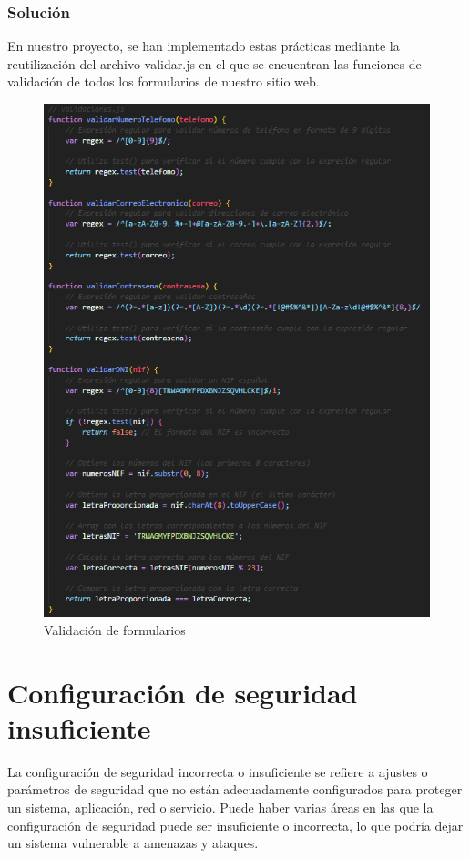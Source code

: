 \documentclass{report}
\begin{document}
                \subsubsection{Solución}
                    En nuestro proyecto, se han implementado estas prácticas mediante la reutilización del archivo validar.js en el que se encuentran las funciones de validación de todos los formularios de nuestro sitio web.
                    \begin{figure}[H]
                        \centering
                        \includegraphics[width=\textwidth]{./img/vulnerabilidades/3.4/1.1.png}
                        \caption{Validación de formularios}
                    \end{figure}
            \clearpage
        \section{Configuración de seguridad insuficiente}
            La configuración de seguridad incorrecta o insuficiente se refiere a ajustes o parámetros de seguridad que no están adecuadamente configurados para proteger un sistema, aplicación, red o servicio. Puede haber varias áreas en las que la configuración de seguridad puede ser insuficiente o incorrecta, lo que podría dejar un sistema vulnerable a amenazas y ataques.
\end{document}
